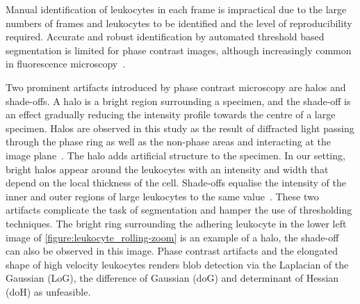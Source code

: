 Manual identification of leukocytes in each frame is impractical due to the large numbers of frames and leukocytes to be identified and the level of reproducibility required. Accurate and robust identification by automated threshold based segmentation is limited for phase contrast images, although increasingly common in fluorescence microscopy~\cite{Hand2009}.

Two prominent artifacts introduced by phase contrast microscopy are halos and shade-offs. A halo is a bright region surrounding a specimen, and the shade-off is an effect gradually reducing the intensity profile towards the centre of a large specimen. Halos are observed in this study as the result of diffracted light passing through the phase ring as well as the non-phase areas and interacting at the image plane~\cite{Yin2012}. The halo adds artificial structure to the specimen. In our setting, bright halos appear around the leukocytes with an intensity and width that depend on the local thickness of the cell. Shade-offs equalise the intensity of the inner and outer regions of large leukocytes to the same value~\cite{Otaki2000}. These two artifacts complicate the task of segmentation and hamper the use of thresholding techniques. The bright ring surrounding the adhering leukocyte in the lower left image of \autoref{figure:leukocyte_rolling-zoom} is an example of a halo, the shade-off can also be observed in this image. Phase contrast artifacts and the elongated shape of high velocity leukocytes renders blob detection via the Laplacian of the Gaussian (LoG), the difference of Gaussian (doG) and determinant of Hessian (doH) as unfeasible.

